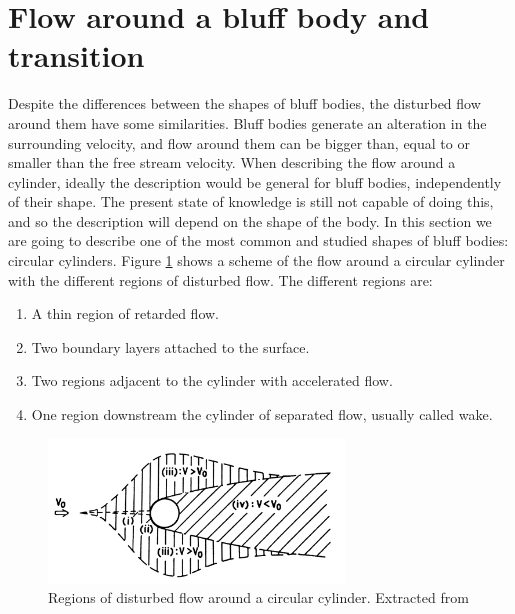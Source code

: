 \documentclass[journal]{new-aiaa}
\begin{document}
\section{Flow around a bluff body and transition}

Despite the differences between the shapes of bluff bodies, the disturbed flow around them have some similarities. Bluff bodies generate an alteration in the surrounding velocity, and flow around them can be bigger than, equal to or smaller than the free stream velocity. When describing the flow around a cylinder, ideally  the description would be general for bluff bodies, independently of their shape. The present state of knowledge is still not capable of doing this, and so the description will depend on the shape of the body. In this section we are going to describe one of the most common and studied shapes of bluff bodies: circular cylinders. Figure \ref{fig:RegionsFlow} shows a scheme of the flow around a circular cylinder with the different regions of disturbed flow. The different regions are:

\begin{enumerate}[label=(\roman*)]
\item A thin region of retarded flow.
\item Two boundary layers attached to the surface.
\item Two regions adjacent to the cylinder with accelerated flow.
\item One region downstream the cylinder of separated flow, usually called wake.
\end{enumerate}

\begin{figure}[H]
\begin{center}
\includegraphics[width=0.7\textwidth]{Images/federico/Figure01}
\caption{ Regions of disturbed flow around a circular cylinder. Extracted from \cite{Zdravkovich1997} }
\label{fig:RegionsFlow}
\end{center}
\end{figure}
\end{document}
